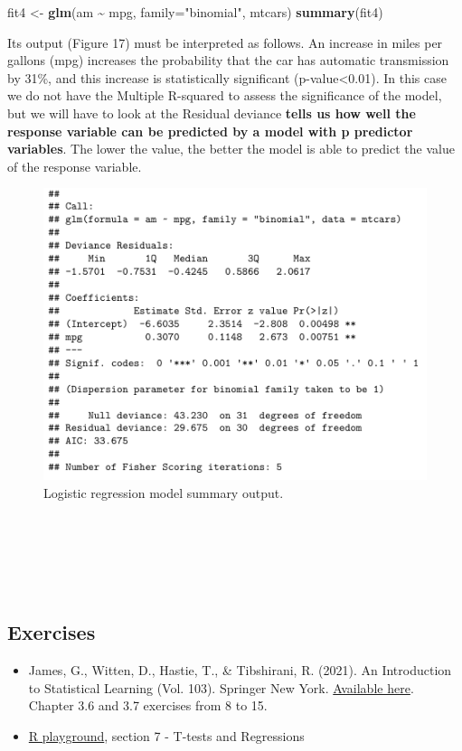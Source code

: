 \documentclass[
]{article}
\newenvironment{Shaded}{\begin{snugshade}}{\end{snugshade}}
\newcommand{\AttributeTok}[1]{\textcolor[rgb]{0.13,0.29,0.53}{#1}}
\newcommand{\FunctionTok}[1]{\textcolor[rgb]{0.13,0.29,0.53}{\textbf{#1}}}
\newcommand{\NormalTok}[1]{#1}
\newcommand{\OtherTok}[1]{\textcolor[rgb]{0.56,0.35,0.01}{#1}}
\newcommand{\SpecialCharTok}[1]{\textcolor[rgb]{0.81,0.36,0.00}{\textbf{#1}}}
\newcommand{\StringTok}[1]{\textcolor[rgb]{0.31,0.60,0.02}{#1}}
\begin{document}
\begin{Shaded}
\begin{Highlighting}[]
\NormalTok{fit4 }\OtherTok{\textless{}{-}} \FunctionTok{glm}\NormalTok{(am }\SpecialCharTok{\textasciitilde{}}\NormalTok{ mpg, }\AttributeTok{family=}\StringTok{"binomial"}\NormalTok{, mtcars)}
\FunctionTok{summary}\NormalTok{(fit4)}
\end{Highlighting}
\end{Shaded}

Its output (Figure 17) must be interpreted as follows. An increase in
miles per gallons (mpg) increases the probability that the car has
automatic transmission by 31\%, and this increase is statistically
significant (p-value\textless0.01). In this case we do not have the Multiple
R-squared to assess the significance of the model, but we will have to
look at the Residual deviance \textbf{tells us how well the response variable
can be predicted by a model with p predictor variables}. The lower the
value, the better the model is able to predict the value of the response
variable.

\begin{figure}[H]

{\centering \includegraphics[width=0.5\linewidth,]{images/Schermata 2022-07-07 alle 18.49.38} 

}

\caption{Logistic regression model summary output.}\label{fig:unnamed-chunk-80}
\end{figure}

~

~

~

\hypertarget{exercises-4}{%
\subsection{Exercises}\label{exercises-4}}

\begin{itemize}
\item
  James, G., Witten, D., Hastie, T., \& Tibshirani, R. (2021). An
  Introduction to Statistical Learning (Vol. 103). Springer New York.
  \href{https://www.statlearning.com}{Available here}. Chapter 3.6 and 3.7
  exercises from 8 to 15.
\item
  \href{https://federicoroscioli.shinyapps.io/exercises/}{R playground},
  section 7 - T-tests and Regressions
\end{itemize}
\end{document}

